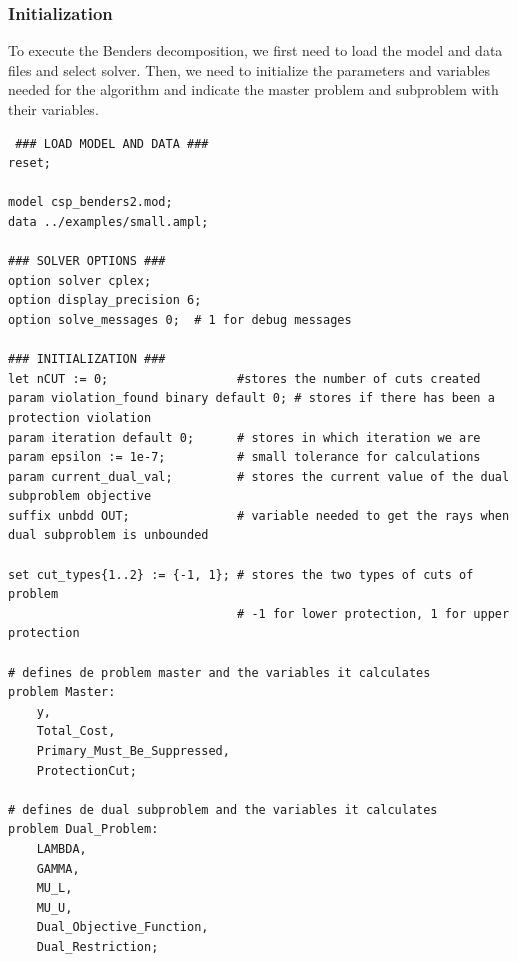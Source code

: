 \documentclass[11pt,a4paper]{article}
\begin{document}
\subsubsection{Initialization}
To execute the Benders decomposition, we first need to load the model and data files and select solver.
Then, we need to initialize the parameters and variables needed for the algorithm and indicate the master problem and subproblem with their variables.
\begin{lstlisting}
 ### LOAD MODEL AND DATA ###
reset;

model csp_benders2.mod;
data ../examples/small.ampl;

### SOLVER OPTIONS ###
option solver cplex;      
option display_precision 6;
option solve_messages 0;  # 1 for debug messages

### INITIALIZATION ###
let nCUT := 0;					#stores the number of cuts created
param violation_found binary default 0; # stores if there has been a protection violation
param iteration default 0;		# stores in which iteration we are
param epsilon := 1e-7;			# small tolerance for calculations
param current_dual_val;			# stores the current value of the dual subproblem objective
suffix unbdd OUT;				# variable needed to get the rays when dual subproblem is unbounded

set cut_types{1..2} := {-1, 1};	# stores the two types of cuts of problem
								# -1 for lower protection, 1 for upper protection

# defines de problem master and the variables it calculates
problem Master:
    y,
    Total_Cost,
    Primary_Must_Be_Suppressed,
    ProtectionCut;
    
# defines de dual subproblem and the variables it calculates
problem Dual_Problem:
    LAMBDA,
    GAMMA,
    MU_L,
    MU_U,
    Dual_Objective_Function,
    Dual_Restriction;
\end{lstlisting}
\end{document}
